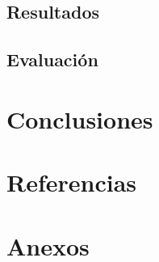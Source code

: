 \documentclass[letter]{article}
\begin{document}
\subsection{Resultados}
\label{sec:orgb7473e7}
\subsection{Evaluación}
\label{sec:org8473b54}
\section{Conclusiones}
\label{sec:org9b1a441}

\section{Referencias}
\label{sec:org5d142a1}

\section{Anexos}
\label{sec:orgdfb6bfe}
\end{document}
